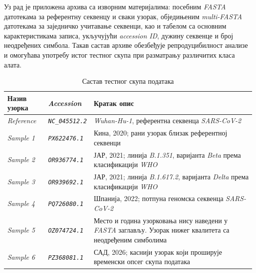 \documentclass[12pt,oneside]{memoir}
\begin{document}
Уз рад је приложена архива са изворним материјалима: посебним \textit{FASTA} датотекама за референтну секвенцу и сваки узорак, обједињеним \textit{multi-FASTA} датотекама за заједничко учитавање секвенци, као и табелом са основним карактеристикама записа, укључујући \textit{accession ID}, дужину секвенце и број неодређених симбола. Такав састав архиве обезбеђује репродуцибилност анализе и омогућава употребу истог тестног скупа при разматрању различитих класа алата.

\begin{table}[htbp]
\centering
\small
\caption{Састав тестног скупа података}
\label{tab:testni-skup-podataka}

\begin{tabularx}{\textwidth}{|p{}|p{}|Y|}
\hline
\textbf{Назив узорка} & \textbf{\textit{Accession}} & \textbf{Кратак опис} \\
\hline

\textit{Reference} &
\texttt{\textit{NC\_045512.2}} &
\textit{Wuhan-Hu-1}, референтна секвенца \textit{SARS-CoV-2} \\
\hline

\textit{Sample 1} &
\texttt{\textit{PX622476.1}} &
Кина, 2020; рани узорак близак референтној секвенци \\
\hline

\textit{Sample 2} &
\texttt{\textit{OR936774.1}} &
ЈАР, 2021; линија \textit{B.1.351}, варијанта \textit{Beta} према класификацији \textit{WHO} \\
\hline

\textit{Sample 3} &
\texttt{\textit{OR939692.1}} &
ЈАР, 2021; линија \textit{B.1.617.2}, варијанта \textit{Delta} према класификацији \textit{WHO} \\
\hline

\textit{Sample 4} &
\texttt{\textit{PQ726080.1}} &
Шпанија, 2022; потпуна геномска секвенца \textit{SARS-CoV-2} \\
\hline

\textit{Sample 5} &
\texttt{\textit{OZ074724.1}} &
Место и година узорковања нису наведени у \textit{FASTA} заглављу. Узорак нижег квалитета са неодређеним симболима \\
\hline

\textit{Sample 6} &
\texttt{\textit{PZ368081.1}} &
САД, 2026; каснији узорак који проширује временски опсег скупа података \\
\hline

\end{tabularx}
\end{table}
\end{document}
